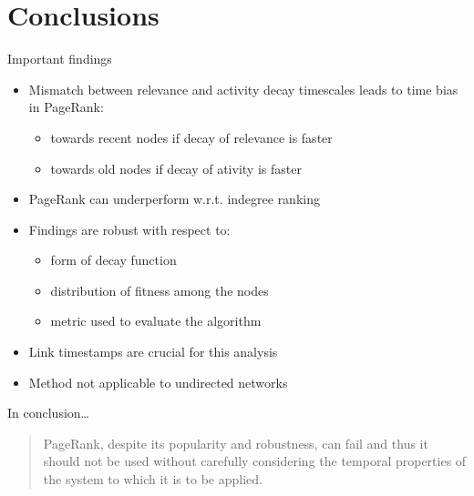 \section{Conclusions}

\begin{frame}{Important findings}
    \begin{itemize}
        \item Mismatch between relevance and activity decay timescales leads to \alert{time bias} in PageRank:
        \begin{itemize}
            \item towards recent nodes if decay of relevance is faster
            \item towards old nodes if decay of ativity is faster
        \end{itemize}
        \item PageRank can underperform w.r.t. \alert{indegree ranking}
        \item Findings are \alert{robust} with respect to:
        \begin{itemize}
            \item form of decay function
            \item distribution of fitness among the nodes
            \item metric used to evaluate the algorithm
        \end{itemize}
        \item Link \alert{timestamps} are crucial for this analysis
        \item Method not applicable to undirected networks
    \end{itemize}

\end{frame}

\begin{frame}{In conclusion\ldots}
    \begin{quote}
        PageRank, despite its popularity and robustness, \alert{can fail} and thus it should not be used without \alert{carefully considering the temporal properties of the system} to which it is to be applied.
    \end{quote}
\end{frame}
